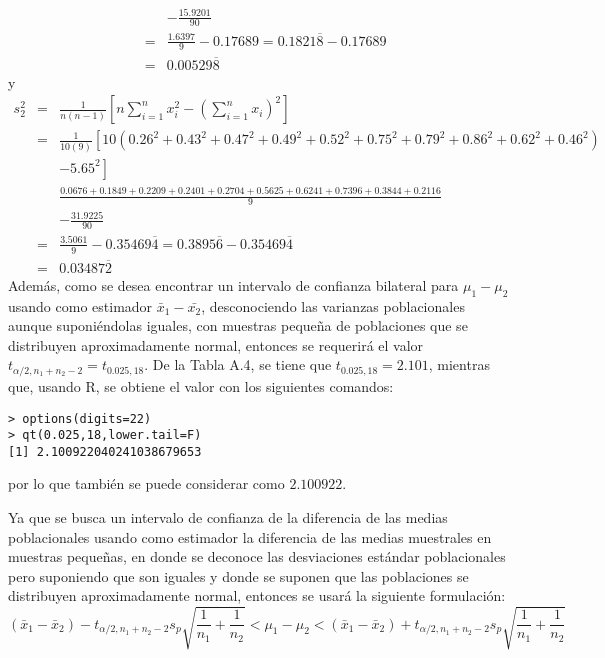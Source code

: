 \begin{solucion}
\begin{eqnarray*}
  & & - \frac{15.9201}{90} \\
  & = & \frac{1.6397}{9} - 0.17689 = 0.1821\overline{8} - 0.17689 \\
  & = & 0.00529\overline{8}
 \end{eqnarray*}
 y
 \begin{eqnarray*}
  s^2_2 & = & \frac{1}{n(n-1)} \left[ n\sum_{i=1}^n x_i^2 - \left( \sum_{i=1}^n x_i \right)^2 \right] \\
  & = & \frac{1}{10(9)} \left[ 10\left( 0.26^2 + 0.43^2 + 0.47^2 + 0.49^2 + 0.52^2 + 0.75^2 + 0.79^2 + 0.86^2 + 0.62^2 + 0.46^2 \right) \right. \\
  & & \left. - 5.65^2 \right] \\
  & & \frac{0.0676 + 0.1849 + 0.2209 + 0.2401 + 0.2704 + 0.5625 + 0.6241 + 0.7396 + 0.3844 + 0.2116}{9} \\
  & & - \frac{31.9225}{90} \\
  & = & \frac{3.5061}{9} - 0.35469\overline{4} = 0.3895\overline{6} - 0.35469\overline{4} \\
  & = & 0.03487\overline{2}
 \end{eqnarray*}
 Adem\'as, como se desea encontrar un intervalo de confianza bilateral para $\mu_1 - \mu_2$ usando como estimador $\bar{x}_1 - \bar{x_2}$, desconociendo las varianzas poblacionales aunque suponi\'endolas iguales, con muestras peque\~na de poblaciones que se distribuyen aproximadamente normal, entonces se requerir\'a el valor $t_{\alpha/2,n_1+n_2-2} = t_{0.025,18}$. De la Tabla A.4, se tiene que $t_{0.025,18} = 2.101$, mientras que, usando R, se obtiene el valor con los siguientes comandos:
 \begin{verbatim}
> options(digits=22)
> qt(0.025,18,lower.tail=F)
[1] 2.100922040241038679653
 \end{verbatim}
 \vspace{-0.5cm}
 por lo que tambi\'en se puede considerar como $2.100922$.
 \par 
 Ya que se busca un intervalo de confianza de la diferencia de las medias poblacionales usando como estimador la diferencia de las medias muestrales en muestras peque\~nas, en donde se deconoce las desviaciones est\'andar poblacionales pero suponiendo que son iguales y donde se suponen que las poblaciones se distribuyen aproximadamente normal, entonces se usar\'a la siguiente formulaci\'on:
 \begin{equation*}
  \left( \bar{x}_1 - \bar{x}_2  \right) - t_{\alpha/2,n_1+n_2-2}s_p \sqrt{\frac{1}{n_1} + \frac{1}{n_2}} < \mu_1 - \mu_2 < \left( \bar{x}_1 - \bar{x}_2  \right) + t_{\alpha/2,n_1+n_2-2}s_p \sqrt{\frac{1}{n_1} + \frac{1}{n_2}}

\end{equation*}
\end{solucion}
